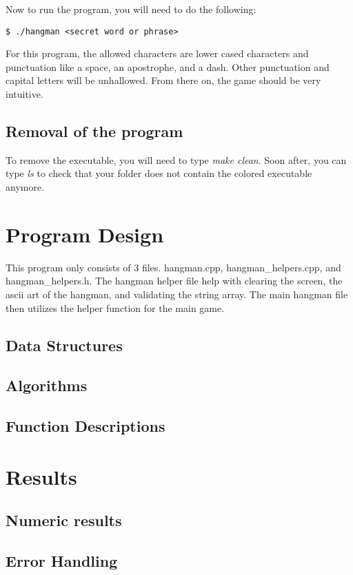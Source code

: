 \documentclass{article}
\begin{document}
Now to run the program, you will need to do the following:

\begin{Verbatim}[frame=single]
    $ ./hangman <secret word or phrase>
\end{Verbatim}

For this program, the allowed characters are lower cased characters and punctuation like a space, an apostrophe, and a dash. Other punctuation and capital letters will be unhallowed. From there on, the game should be very intuitive.

\subsection{Removal of the program}

To remove the executable, you will need to type \textit{make clean}. Soon after, you can type \textit{ls} to check that your folder does not contain the colored executable anymore.

\section{Program Design}

This program only consists of 3 files. hangman.cpp, hangman\_helpers.cpp, and hangman\_helpers.h. The hangman helper file help with clearing the screen, the ascii art of the hangman, and validating the string array. The main hangman file then utilizes the helper function for the main game.

\subsection{Data Structures}


\subsection*{Algorithms}

\subsection{Function Descriptions}


\section{Results}

\subsection{Numeric results}


\subsection{Error Handling}











\end{document}
